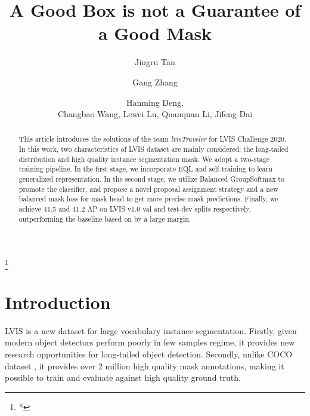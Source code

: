 \documentclass[runningheads]{llncs}
\newcommand\blfootnote[1]{\begingroup
  \renewcommand\thefootnote{}\footnote{#1}\addtocounter{footnote}{-1}\endgroup
}
\begin{document}
\pagestyle{headings}
\mainmatter

\title{A Good Box is not a Guarantee of a Good Mask} 

\author{Jingru Tan \and
Gang Zhang \and
Hanming Deng,
\\
Changbao Wang,  Lewei Lu, Quanquan Li, Jifeng Dai}
\maketitle
\blfootnote{*}
\begin{abstract}
This article introduces the solutions of the team \textit{lvisTraveler} for LVIS Challenge 2020. In this work, two characteristics of LVIS dataset are mainly considered: the long-tailed distribution and high quality instance segmentation mask. We adopt a two-stage training pipeline. In the first stage, we incorporate EQL and self-training to learn generalized representation. In the second stage, we utilize Balanced GroupSoftmax to promote the classifier, and propose a novel proposal assignment strategy and a new balanced mask loss for mask head to get more precise mask predictions. Finally, we achieve 41.5 and 41.2 AP on LVIS v1.0 val and test-dev splits respectively, outperforming the baseline based on  by a large margin.

\end{abstract}







 \section{Introduction}
 
 LVIS is a new dataset for large vocabulary instance segmentation. Firstly, given modern object detectors perform poorly in few samples regime, it provides new research opportunities for long-tailed object detection. Secondly, unlike COCO dataset \cite{lin2014microsoft}, it provides over 2 million high quality mask annotations, making it possible to train and evaluate against high quality ground truth.
 
\end{document}
